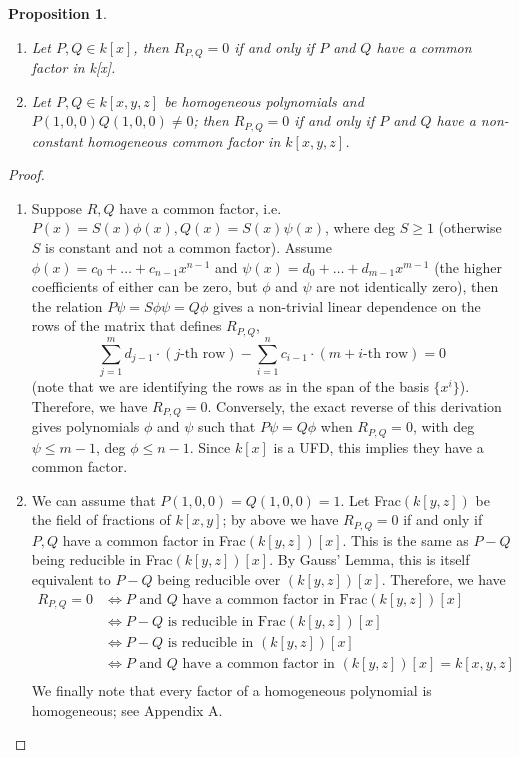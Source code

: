 \documentclass{article}
\newtheorem{proposition}{Proposition}
\theoremstyle{remark}
\begin{document}
\begin{proposition} \begin{enumerate} 
\item Let $P,Q\in k[x]$, then $R_{P,Q}=0$ if and only if $P$ and $Q$ have a common factor in k[x].
\item Let $P,Q\in k[x,y,z]$ be homogeneous polynomials and $P(1,0,0)Q(1,0,0)\neq 0$; then $R_{P,Q}=0$ if and only if $P$ and $Q$ have a non-constant homogeneous common factor in  $k[x,y,z]$.

\end{enumerate} \end{proposition} \begin{proof} \begin{enumerate}

    \item Suppose $R,Q$ have a common factor, i.e. $P(x)=S(x)\phi (x), Q(x)=S(x)\psi (x)$, where deg $S\geq 1$ (otherwise $S$ is constant and not a common factor). Assume $\phi (x)=c_0 + \ldots +c_{n-1}x^{n-1}$ and $\psi (x)=d_0 + \ldots + d_{m-1}x^{m-1}$ (the higher coefficients of either can be zero, but $\phi$ and $\psi$ are not identically zero), then the relation $P\psi = S\phi \psi =Q\phi $ gives a non-trivial linear dependence on the rows of the matrix that defines $R_{P,Q}$,
    \[
\sum_{j=1}^{m} d_{j-1}\cdot(j\text{-th row}) - \sum_{i=1}^{n} c_{i-1}\cdot(m+i \text{-th row})=0
\]
(note that we are identifying the rows as in the span of the basis $\{x^i\}$). Therefore, we have $R_{P,Q}=0$. Conversely, the exact reverse of this derivation gives polynomials $\phi$ and $\psi$ such that $P\psi =Q\phi $ when $R_{P,Q} =0$, with deg $\psi \leq m-1$, deg $\phi \leq n-1$. Since $k[x]$ is a UFD, this implies they have a common factor.

\item We can assume that $P(1,0,0)=Q(1,0,0)=1$. Let Frac$(k[y,z])$ be the field of fractions of $k[x,y]$; by above we have $R_{P,Q}=0$ if and only if $P,Q$ have a common factor in Frac$(k[y,z])[x]$. This is the same as $P-Q$ being reducible in Frac$(k[y,z])[x]$. By Gauss' Lemma, this is itself equivalent to $P-Q$ being reducible over $(k[y,z])[x]$. Therefore, we have 
\begin{equation*}
\begin{split}
R_{P,Q}=0 & \iff P \text{ and } Q \text{ have a common factor in Frac} (k[y,z])[x]         \\
                  & \iff P-Q \text{ is reducible in Frac} (k[y,z])[x]                                            \\
                  & \iff P-Q \text{ is reducible in } (k[y,z])[x]                                                     \\
                  & \iff P \text{ and } Q \text{ have a common factor in } (k[y,z])[x] = k[x,y,z]   \\
\end{split}
\end{equation*}
We finally note that every factor of a homogeneous polynomial is homogeneous; see Appendix A.
\end{enumerate} \end{proof}
\end{document}
